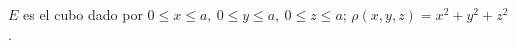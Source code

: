 \item $E$ es el cubo dado por $0 \le x \le a, \ 0 \le y \le a, \ 0 \le z \le a$; $\rho(x, y, z) = x^2 + y^2 + z^2$.
